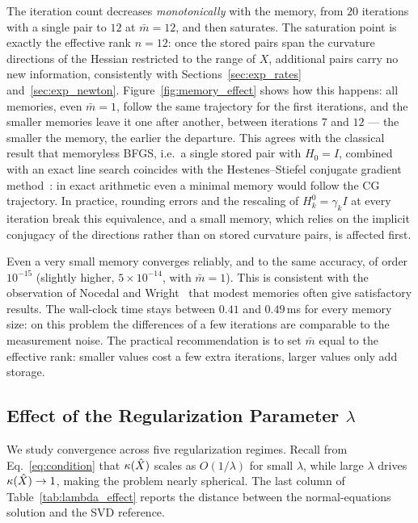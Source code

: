 \noindent The iteration count decreases \emph{monotonically} with the memory, from
$20$ iterations with a single pair to $12$ at $\bar m = 12$, and then
saturates. The saturation point is exactly the effective rank $n = 12$: once
the stored pairs span the curvature directions of the Hessian restricted to
the range of $X$, additional pairs carry no new information, consistently
with Sections~\ref{sec:exp_rates} and~\ref{sec:exp_newton}.
Figure~\ref{fig:memory_effect} shows how this happens: all memories, even
$\bar m = 1$, follow the same trajectory for the first iterations, and the
smaller memories leave it one after another, between iterations $7$ and $12$
--- the smaller the memory, the earlier the departure. This agrees with the
classical result that memoryless BFGS, i.e.\ a single stored pair with
$H_0 = I$, combined with an exact line search coincides with the
Hestenes--Stiefel conjugate gradient
method~\cite[Sec.~9.1]{nocedal2006numerical}: in exact arithmetic even a
minimal memory would follow the CG trajectory. In practice, rounding errors
and the rescaling of $H_k^0 = \gamma_k I$ at every iteration break this
equivalence, and a small memory, which relies on the implicit conjugacy of
the directions rather than on stored curvature pairs, is affected first.

\noindent Even a very small memory converges reliably, and to the same accuracy,
of order $10^{-15}$ (slightly higher, $5 \times 10^{-14}$, with $\bar m = 1$).
This is consistent with the observation of Nocedal and
Wright~\cite[Sec.~9.1]{nocedal2006numerical} that modest memories often give
satisfactory results. The wall-clock time stays between $0.41$ and
$0.49$\,ms for every memory size: on this problem the differences of a few
iterations are comparable to the measurement noise. The practical
recommendation is to set $\bar{m}$ equal to the effective rank: smaller
values cost a few extra iterations, larger values only add storage.


\subsection{Effect of the Regularization Parameter $\lambda$}
\label{sec:exp_lambda}

\noindent We study convergence across five regularization regimes. Recall from
Eq.~\eqref{eq:condition} that $\kappa(\hat{X})$ scales as $O(1/\lambda)$ for
small $\lambda$, while large $\lambda$ drives $\kappa(\hat{X}) \to 1$, making
the problem nearly spherical. The last column of Table~\ref{tab:lambda_effect}
reports the distance between the normal-equations solution and the SVD
reference.


